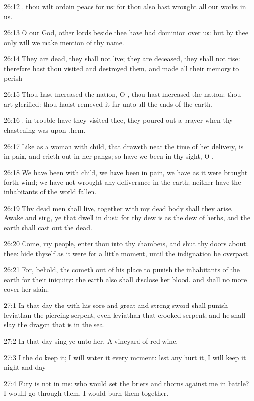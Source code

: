26:12 \LORD, thou wilt ordain peace for us: for thou also hast wrought
all our works in us.

26:13 O \LORD our God, other lords beside thee have had dominion over
us: but by thee only will we make mention of thy name.

26:14 They are dead, they shall not live; they are deceased, they
shall not rise: therefore hast thou visited and destroyed them, and
made all their memory to perish.

26:15 Thou hast increased the nation, O \LORD, thou hast increased the
nation: thou art glorified: thou hadst removed it far unto all the
ends of the earth.

26:16 \LORD, in trouble have they visited thee, they poured out a
prayer when thy chastening was upon them.

26:17 Like as a woman with child, that draweth near the time of her
delivery, is in pain, and crieth out in her pangs; so have we been in
thy sight, O \LORD.

26:18 We have been with child, we have been in pain, we have as it
were brought forth wind; we have not wrought any deliverance in the
earth; neither have the inhabitants of the world fallen.

26:19 Thy dead men shall live, together with my dead body shall they
arise. Awake and sing, ye that dwell in dust: for thy dew is as the
dew of herbs, and the earth shall cast out the dead.

26:20 Come, my people, enter thou into thy chambers, and shut thy
doors about thee: hide thyself as it were for a little moment, until
the indignation be overpast.

26:21 For, behold, the \LORD cometh out of his place to punish the
inhabitants of the earth for their iniquity: the earth also shall
disclose her blood, and shall no more cover her slain.

27:1 In that day the \LORD with his sore and great and strong sword
shall punish leviathan the piercing serpent, even leviathan that
crooked serpent; and he shall slay the dragon that is in the sea.

27:2 In that day sing ye unto her, A vineyard of red wine.

27:3 I the \LORD do keep it; I will water it every moment: lest any
hurt it, I will keep it night and day.

27:4 Fury is not in me: who would set the briers and thorns against me
in battle? I would go through them, I would burn them together.

